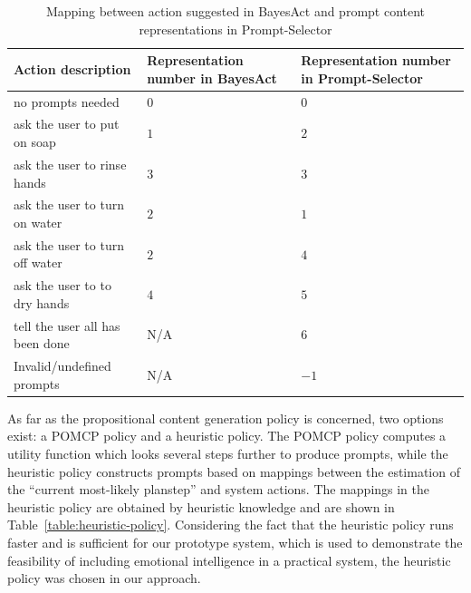 %
\begin{table}
\centering
\caption{Mapping between action suggested in BayesAct and prompt content representations in Prompt-Selector}
\label{table:prompt-number-def}
\begin{tabular}{| l | p{4.5cm} | p{4.5cm} |}
\hline
Action description & Representation number in BayesAct & Representation number in Prompt-Selector \\ \hline
no prompts needed & 0 & 0\\ \hline
ask the user to put on soap & $1$ & $2$ \\ \hline
ask the user to rinse hands & $3$ & $3$ \\ \hline
ask the user to turn on water & $2$ & $1$ \\ \hline
ask the user to turn off water & $2$ & $4$ \\ \hline
ask the user to to dry hands & $4$ & $5$ \\ \hline
tell the user all has been done & N/A & $6$ \\ \hline
Invalid/undefined prompts & N/A &$-1$ \\ \hline
\end{tabular}
\end{table}

As far as the propositional content generation policy is concerned, two options exist: a POMCP policy and a heuristic policy. The POMCP policy computes a utility function which looks several steps further to produce prompts, while the heuristic policy constructs prompts based on mappings between the estimation of the ``current most-likely  planstep'' and system actions. The mappings in the heuristic policy are obtained by heuristic knowledge and are shown in Table~\ref{table:heuristic-policy}. Considering the fact that the heuristic policy runs faster and is sufficient for our prototype system, which is used to demonstrate the feasibility of including emotional intelligence in a practical system, the heuristic policy was chosen in our approach.

